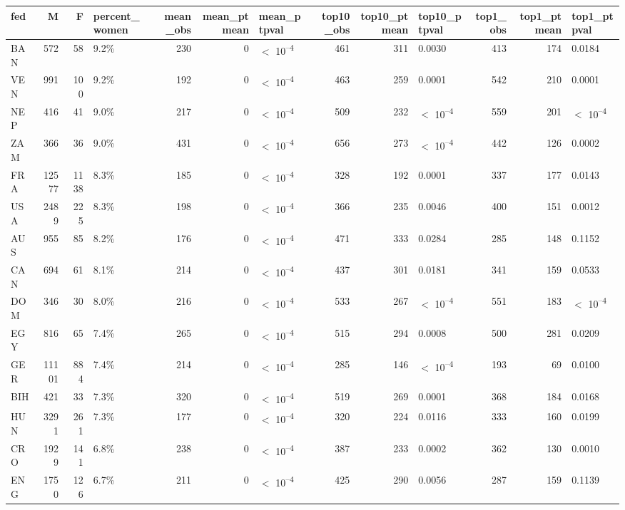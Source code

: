 
\begin{tabular}{l|r|r|l|r|r|l|r|r|l|r|r|l}
\hline
fed & M & F & percent_women & mean_obs & mean_ptmean & mean_ptpval & top10_obs & top10_ptmean & top10_ptpval & top1_obs & top1_ptmean & top1_ptpval\\
\hline
BAN & 572 & 58 & 9.2\% & 230 & 0 & $<$ 10\textsuperscript{--4} & 461 & 311 & 0.0030 & 413 & 174 & 0.0184\\
\hline
VEN & 991 & 100 & 9.2\% & 192 & 0 & $<$ 10\textsuperscript{--4} & 463 & 259 & 0.0001 & 542 & 210 & 0.0001\\
\hline
NEP & 416 & 41 & 9.0\% & 217 & 0 & $<$ 10\textsuperscript{--4} & 509 & 232 & $<$ 10\textsuperscript{--4} & 559 & 201 & $<$ 10\textsuperscript{--4}\\
\hline
ZAM & 366 & 36 & 9.0\% & 431 & 0 & $<$ 10\textsuperscript{--4} & 656 & 273 & $<$ 10\textsuperscript{--4} & 442 & 126 & 0.0002\\
\hline
FRA & 12577 & 1138 & 8.3\% & 185 & 0 & $<$ 10\textsuperscript{--4} & 328 & 192 & 0.0001 & 337 & 177 & 0.0143\\
\hline
USA & 2489 & 225 & 8.3\% & 198 & 0 & $<$ 10\textsuperscript{--4} & 366 & 235 & 0.0046 & 400 & 151 & 0.0012\\
\hline
AUS & 955 & 85 & 8.2\% & 176 & 0 & $<$ 10\textsuperscript{--4} & 471 & 333 & 0.0284 & 285 & 148 & 0.1152\\
\hline
CAN & 694 & 61 & 8.1\% & 214 & 0 & $<$ 10\textsuperscript{--4} & 437 & 301 & 0.0181 & 341 & 159 & 0.0533\\
\hline
DOM & 346 & 30 & 8.0\% & 216 & 0 & $<$ 10\textsuperscript{--4} & 533 & 267 & $<$ 10\textsuperscript{--4} & 551 & 183 & $<$ 10\textsuperscript{--4}\\
\hline
EGY & 816 & 65 & 7.4\% & 265 & 0 & $<$ 10\textsuperscript{--4} & 515 & 294 & 0.0008 & 500 & 281 & 0.0209\\
\hline
GER & 11101 & 884 & 7.4\% & 214 & 0 & $<$ 10\textsuperscript{--4} & 285 & 146 & $<$ 10\textsuperscript{--4} & 193 & 69 & 0.0100\\
\hline
BIH & 421 & 33 & 7.3\% & 320 & 0 & $<$ 10\textsuperscript{--4} & 519 & 269 & 0.0001 & 368 & 184 & 0.0168\\
\hline
HUN & 3291 & 261 & 7.3\% & 177 & 0 & $<$ 10\textsuperscript{--4} & 320 & 224 & 0.0116 & 333 & 160 & 0.0199\\
\hline
CRO & 1929 & 141 & 6.8\% & 238 & 0 & $<$ 10\textsuperscript{--4} & 387 & 233 & 0.0002 & 362 & 130 & 0.0010\\
\hline
ENG & 1750 & 126 & 6.7\% & 211 & 0 & $<$ 10\textsuperscript{--4} & 425 & 290 & 0.0056 & 287 & 159 & 0.1139\\

\end{tabular}
